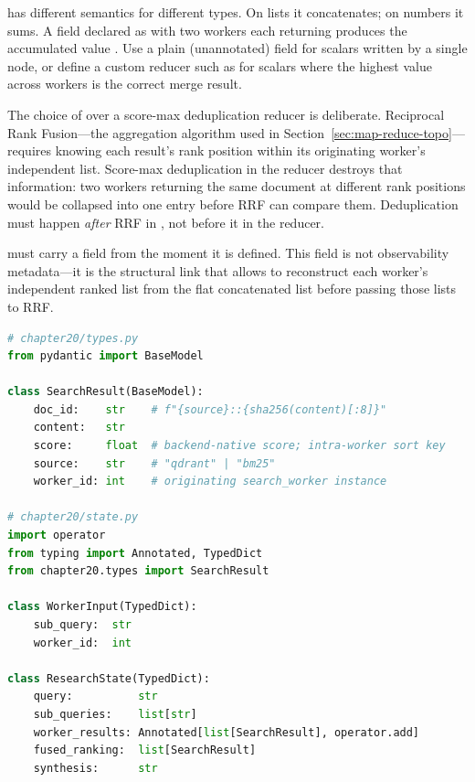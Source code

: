 \begin{warningbox}
 has different semantics for different types.
On lists it concatenates; on numbers it sums. A field declared as
 with two workers each returning
 produces the accumulated value . Use a plain
(unannotated) field for scalars written by a single node, or define a
custom reducer such as  for scalars where the highest
value across workers is the correct merge result.
\end{warningbox}

The choice of  over a score-max deduplication reducer
is deliberate. Reciprocal Rank Fusion---the aggregation algorithm used in
Section~\ref{sec:map-reduce-topo}---requires knowing each result's rank
position within its originating worker's independent list.
Score-max deduplication in the reducer destroys that information: two
workers returning the same document at different rank positions would be
collapsed into one entry before RRF can compare them. Deduplication must
happen \emph{after} RRF in , not before it in the
reducer.

 must carry a  field from the moment
it is defined. This field is not observability metadata---it is the
structural link that allows  to reconstruct each
worker's independent ranked list from the flat concatenated
 list before passing those lists to RRF.

\begin{lstlisting}[language=Python,
  caption={State schema: list-accumulation reducer and per-result
           worker identifier},
  label={lst:reducers}]
# chapter20/types.py
from pydantic import BaseModel

class SearchResult(BaseModel):
    doc_id:    str    # f"{source}::{sha256(content)[:8]}"
    content:   str
    score:     float  # backend-native score; intra-worker sort key
    source:    str    # "qdrant" | "bm25"
    worker_id: int    # originating search_worker instance

# chapter20/state.py
import operator
from typing import Annotated, TypedDict
from chapter20.types import SearchResult

class WorkerInput(TypedDict):
    sub_query:  str
    worker_id:  int

class ResearchState(TypedDict):
    query:          str
    sub_queries:    list[str]
    worker_results: Annotated[list[SearchResult], operator.add]
    fused_ranking:  list[SearchResult]
    synthesis:      str
\end{lstlisting}


